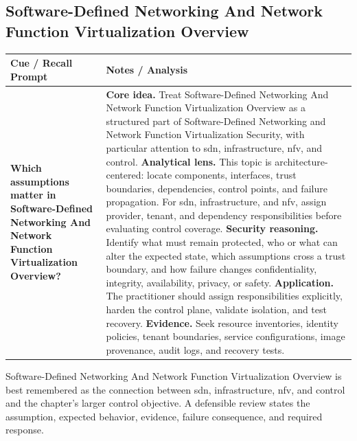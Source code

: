 \documentclass[11pt]{article}
\newcommand{\CornellHeader}{%
\rowcolor{Navy}\color{white}\bfseries Cue / Recall Prompt & \color{white}\bfseries Notes / Analysis\\\hline}
\newcommand{\CornellRow}[2]{%
\cellcolor{CueGray}\RaggedRight\textbf{#1} & \RaggedRight #2\\\hline}
\begin{document}
\subsection*{Software-Defined Networking And Network Function Virtualization Overview}
\begin{longtable}{>{\RaggedRight\arraybackslash}p{}|>{\RaggedRight\arraybackslash}p{}}
\CornellHeader
\CornellRow{Which assumptions matter in Software-Defined Networking And Network Function Virtualization Overview?}{\textbf{Core idea.} Treat Software-Defined Networking And Network Function Virtualization Overview as a structured part of Software-Defined Networking and Network Function Virtualization Security, with particular attention to sdn, infrastructure, nfv, and control. \textbf{Analytical lens.} This topic is architecture-centered: locate components, interfaces, trust boundaries, dependencies, control points, and failure propagation. For sdn, infrastructure, and nfv, assign provider, tenant, and dependency responsibilities before evaluating control coverage. \textbf{Security reasoning.} Identify what must remain protected, who or what can alter the expected state, which assumptions cross a trust boundary, and how failure changes confidentiality, integrity, availability, privacy, or safety. \textbf{Application.} The practitioner should assign responsibilities explicitly, harden the control plane, validate isolation, and test recovery. \textbf{Evidence.} Seek resource inventories, identity policies, tenant boundaries, service configurations, image provenance, audit logs, and recovery tests.}
\end{longtable}
\begin{topicsummary}
Software-Defined Networking And Network Function Virtualization Overview is best remembered as the connection between sdn, infrastructure, nfv, and control and the chapter's larger control objective. A defensible review states the assumption, expected behavior, evidence, failure consequence, and required response.
\end{topicsummary}
\end{document}
